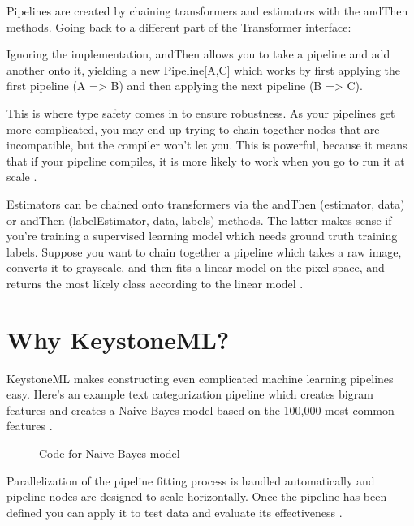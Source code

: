 \documentclass[9pt,twocolumn,twoside]{styles/osajnl}
\begin{document}
Pipelines are created by chaining transformers and estimators with the
andThen methods. Going back to a different part of the Transformer
interface:

Ignoring the implementation, andThen allows you to take a pipeline and
add another onto it, yielding a new Pipeline[A,C] which works by first
applying the first pipeline (A => B) and then applying the next
pipeline (B => C).

This is where type safety comes in to ensure robustness. As your
pipelines get more complicated, you may end up trying to chain
together nodes that are incompatible, but the compiler won’t let
you. This is powerful, because it means that if your pipeline
compiles, it is more likely to work when you go to run it at scale \cite{www-keystoneml} .

Estimators can be chained onto transformers via the andThen
(estimator, data) or andThen (labelEstimator, data, labels)
methods. The latter makes sense if you’re training a supervised
learning model which needs ground truth training labels. Suppose you
want to chain together a pipeline which takes a raw image, converts it
to grayscale, and then fits a linear model on the pixel space, and
returns the most likely class according to the linear model \cite{www-keystoneml} .

\section{Why KeystoneML?}

KeystoneML makes constructing even complicated machine learning
pipelines easy. Here’s an example text categorization pipeline which
creates bigram features and creates a Naive Bayes model based on the
100,000 most common features \cite{www-keystoneml1} .

\begin{figure}[htbp]
\centering
{}
\caption{Code for Naive Bayes model}
\label{fig:Code for Naive Bayes model}
\end{figure}


Parallelization of the pipeline fitting
process is handled automatically and pipeline nodes are designed to
scale horizontally. Once the pipeline has been defined you can apply
it to test data and evaluate its effectiveness \cite{www-keystoneml} .
\end{document}

